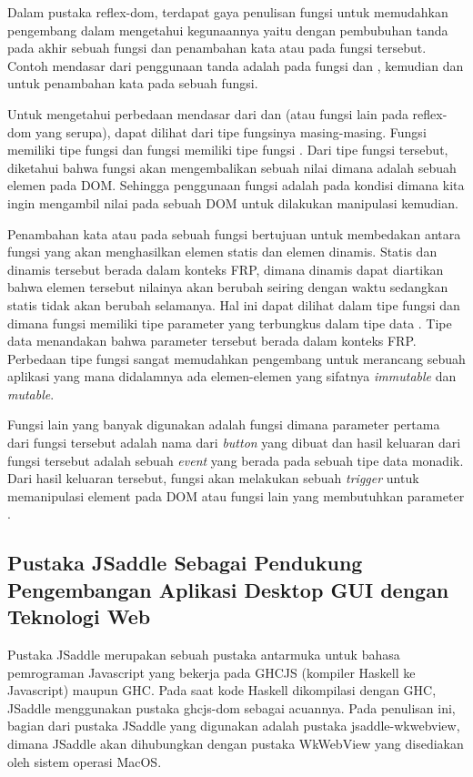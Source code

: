 \documentclass[pi.tex]{subfile}
\begin{document}
    Dalam pustaka reflex-dom, terdapat gaya penulisan fungsi untuk memudahkan pengembang dalam mengetahui kegunaannya yaitu dengan pembubuhan tanda  pada akhir sebuah fungsi dan penambahan kata  atau  pada fungsi tersebut. Contoh mendasar dari penggunaan tanda  adalah pada fungsi  dan , kemudian  dan  untuk penambahan kata  pada sebuah fungsi.

    Untuk mengetahui perbedaan mendasar dari  dan  (atau fungsi lain pada reflex-dom yang serupa), dapat dilihat dari tipe fungsinya masing-masing. Fungsi  memiliki tipe fungsi  dan fungsi  memiliki tipe fungsi . Dari tipe fungsi tersebut, diketahui bahwa fungsi  akan mengembalikan sebuah nilai  dimana  adalah sebuah elemen pada DOM. Sehingga penggunaan fungsi  adalah pada kondisi dimana kita ingin mengambil nilai  pada sebuah DOM untuk dilakukan manipulasi kemudian.

    Penambahan kata  atau  pada sebuah fungsi bertujuan untuk membedakan antara fungsi yang akan menghasilkan elemen statis dan elemen dinamis. Statis dan dinamis tersebut berada dalam konteks FRP, dimana dinamis dapat diartikan bahwa elemen tersebut nilainya akan berubah seiring dengan waktu sedangkan statis tidak akan berubah selamanya. Hal ini dapat dilihat dalam tipe fungsi  dan  dimana fungsi  memiliki tipe parameter yang terbungkus dalam tipe data . Tipe data  menandakan bahwa parameter tersebut berada dalam konteks FRP. Perbedaan tipe fungsi sangat memudahkan pengembang untuk merancang sebuah aplikasi yang mana didalamnya ada elemen-elemen yang sifatnya \emph{immutable} dan \emph{mutable}.

    Fungsi lain yang banyak digunakan adalah fungsi  dimana parameter pertama dari fungsi tersebut adalah nama dari \emph{button} yang dibuat dan hasil keluaran dari fungsi tersebut adalah sebuah \emph{event} yang berada pada sebuah tipe data monadik. Dari hasil keluaran tersebut, fungsi  akan melakukan sebuah \emph{trigger} untuk memanipulasi element pada DOM atau fungsi lain yang membutuhkan parameter .


\subsection{Pustaka JSaddle Sebagai Pendukung Pengembangan Aplikasi Desktop GUI dengan Teknologi Web}
Pustaka JSaddle merupakan sebuah pustaka antarmuka untuk bahasa pemrograman Javascript yang bekerja pada GHCJS (kompiler Haskell ke Javascript) maupun GHC. Pada saat kode Haskell dikompilasi dengan GHC, JSaddle menggunakan pustaka ghcjs-dom sebagai acuannya. Pada penulisan ini, bagian dari pustaka JSaddle yang digunakan adalah pustaka jsaddle-wkwebview, dimana JSaddle akan dihubungkan dengan pustaka WkWebView yang disediakan oleh sistem operasi MacOS.
\end{document}
